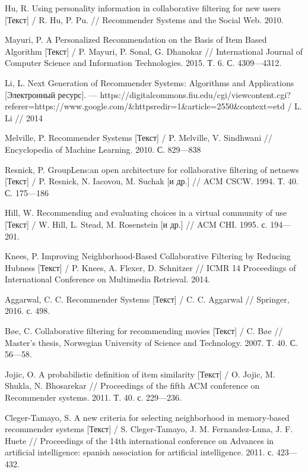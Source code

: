 \begin{thebibliography}{119}
 Hu, R. Using personality information in collaborative filtering for new
users [Текст]  / R. Hu, P. Pu. // Recommender Systems and the Social Web. 2010.

 Mayuri, P. A Personalized Recommendation on the
Basis of Item Based Algorithm [Текст]  / P. Mayuri, P. Sonal, G. Dhanokar // International Journal of Computer Science and
Information Technologies. 2015. Т. 6. С. 4309---4312.

 Li, L. Next Generation of Recommender Systems: Algorithms and Applications   [Электронный ресурс]. ---
https://digitalcommons.fiu.edu/cgi/viewcontent.cgi?referer=https://www.google.com/\&httpsredir=1\&article=2550\&context=etd / L. Li // 2014

 Melville, P. Recommender Systems [Текст]  / P. Melville, V. Sindhwani // Encyclopedia of
Machine Learning. 2010. С. 829---838

 Resnick, P. GroupLens:an open architecture for collaborative filtering of netnews [Текст]  / P. Resnick,
N. Iacovou, M. Suchak [и др.] // ACM CSCW. 1994. Т. 40. С. 175---186

 Hill, W. Recommending and evaluating choices in a virtual community of use [Текст]  / W. Hill,
L. Stead, M. Rosenstein [и др.] // ACM CHI. 1995. с. 194---201.

 Knees, P. Improving Neighborhood-Based Collaborative
Filtering by Reducing Hubness [Текст]  / P. Knees, A. Flexer, D. Schnitzer // ICMR 14 Proceedings of International
Conference on Multimedia Retrieval. 2014.

 Aggarwal, C. C. Recommender Systems [Текст]  / C. C. Aggarwal // Springer, 2016. с. 498.

 Bøe, C. Collaborative filtering for recommending movies [Текст]  / C. Bøe // Master’s thesis,
Norwegian University of Science and Technology. 2007. Т. 40. С. 56---58.

 Jojic, O. A probabilistic definition of item similarity
	[Текст]
/ O. Jojic, M. Shukla, N. Bhosarekar //
Proceedings of the fifth ACM conference on Recommender systems. 2011. Т. 40.
с. 229---236.

 Cleger-Tamayo, S. A new criteria for selecting
neighborhood in memory-based recommender systems [Текст]  / S. Cleger-Tamayo, J. M. Fernandez-Luna,
J. F. Huete // Proceedings of the 14th
international conference on Advances in artificial intelligence: spanish association
for artificial intelligence. 2011. с. 423---432.


\end{thebibliography}
